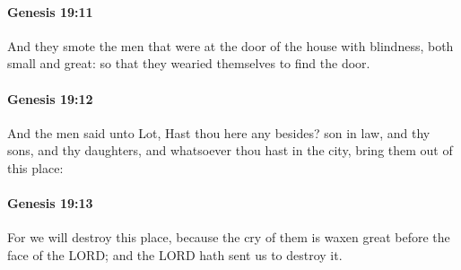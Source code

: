 		\paragraph{Genesis 19:11} %
			\label{GENESIS-19-11}

			And they smote the men that were at the door of the house with blindness, both small and great: so that they wearied themselves to find the door.


		\paragraph{Genesis 19:12} %
			\label{GENESIS-19-12}

			And the men said unto Lot, Hast thou here any besides?  son in law, and thy sons, and thy daughters, and whatsoever thou hast in the city, bring them out of this place:


		\paragraph{Genesis 19:13} %
			\label{GENESIS-19-13}

			For we will destroy this place, because the cry of them is waxen great before the face of the LORD; and the LORD hath sent us to destroy it.


